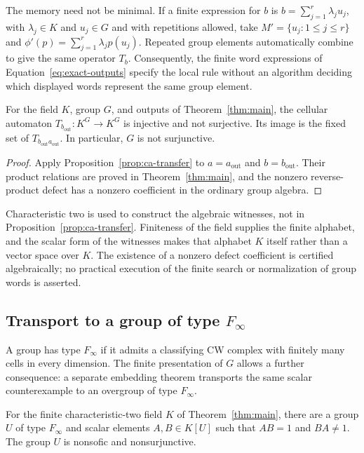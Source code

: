The memory need not be minimal. If a finite expression for $b$ is
$b=\sum_{j=1}^r\lambda_j u_j$, with $\lambda_j\in K$ and
$u_j\in G$ and with repetitions allowed, take
$M'=\{u_j:1\le j\le r\}$ and
$\phi'(p)=\sum_{j=1}^r\lambda_j p(u_j)$. Repeated group elements
automatically combine to give the same operator $T_b$. Consequently,
the finite word expressions of Equation~\eqref{eq:exact-outputs}
specify the local rule without an algorithm deciding which displayed
words represent the same group element.

\begin{corollary}
\label{cor:nonsurjunctive}
For the field $K$, group $G$, and outputs of
Theorem~\ref{thm:main}, the cellular automaton
$T_{b_{\mathrm{out}}}:K^G\to K^G$ is injective and not surjective.
Its image is the fixed set of $T_{b_{\mathrm{out}}a_{\mathrm{out}}}$.
In particular, $G$ is not surjunctive.
\end{corollary}

\begin{proof}
Apply Proposition~\ref{prop:ca-transfer} to
$a=a_{\mathrm{out}}$ and $b=b_{\mathrm{out}}$. Their product
relations are proved in Theorem~\ref{thm:main}, and the nonzero
reverse-product defect has a nonzero coefficient in the ordinary
group algebra.
\end{proof}

Characteristic two is used to construct the algebraic witnesses,
not in Proposition~\ref{prop:ca-transfer}. Finiteness of the field
supplies the finite alphabet, and the scalar form of the witnesses
makes that alphabet $K$ itself rather than a vector space over $K$.
The existence of a nonzero defect coefficient is certified
algebraically; no practical execution of the finite search or
normalization of group words is asserted.

\subsection{Transport to a group of type \texorpdfstring{$F_\infty$}{F infinity}}

A group has type $F_\infty$ if it admits a classifying CW complex with
finitely many cells in every dimension. The finite presentation of $G$
allows a further consequence: a separate embedding theorem transports
the same scalar counterexample to an overgroup of type $F_\infty$.

\begin{corollary}
\label{cor:finfty-counterexample}
For the finite characteristic-two field $K$ of Theorem~\ref{thm:main},
there are a group $U$ of type $F_\infty$ and scalar elements
$A,B\in K[U]$ such that $AB=1$ and $BA\ne1$.
The group $U$ is nonsofic and nonsurjunctive.
\end{corollary}

